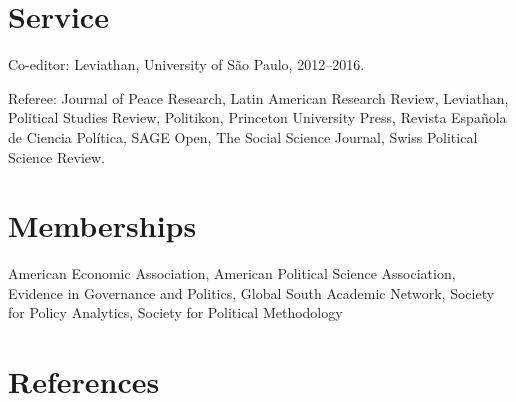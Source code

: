 \documentclass[a4paper]{article}
\renewenvironment{itemize}{
	\begin{list}{}{
			\setlength{\leftmargin}{1.5em}
		}
		}{
	\end{list}
}
\begin{document}

\section*{Service}

\begin{itemize}
\item Co-editor: Leviathan, University of São Paulo, 2012--2016.
\item Referee: Journal of Peace Research, Latin American Research Review, Leviathan, Political Studies Review, Politikon, Princeton University Press, Revista Española de Ciencia Política, SAGE Open, The Social Science Journal, Swiss Political Science Review.
\end{itemize} 

\section*{Memberships}

\begin{itemize}
\item American Economic Association, American Political Science Association, Evidence in Governance and Politics, Global South Academic Network, Society for Policy Analytics, Society for Political Methodology
\end{itemize}

\section*{References}
\end{document}

